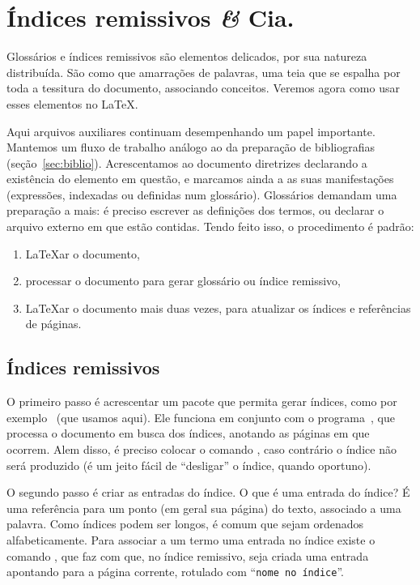 \section{Índices remissivos {\it \&} Cia.}\label{sec:indice-glossario}

Glossários e índices remissivos são elementos delicados, por sua
natureza distribuída. São como que amarrações de palavras, uma teia
que se espalha por toda a tessitura do documento, associando
conceitos. Veremos agora como usar esses elementos no \LaTeX.

Aqui arquivos auxiliares continuam desempenhando um papel
importante. Mantemos um fluxo de trabalho análogo ao da
preparação de bibliografias (seção~\ref{sec:biblio}). Acrescentamos ao
documento diretrizes declarando a existência do elemento em questão, e
marcamos ainda a as suas manifestações (expressões, indexadas ou
definidas num glossário). Glossários demandam uma preparação a mais: é
preciso escrever as definições dos termos, ou declarar o arquivo
externo em que estão contidas. Tendo feito isso, o procedimento é
padrão:
\begin{enumerate}
\item \LaTeX ar o documento,
\item processar o documento para gerar glossário ou índice remissivo,
\item \LaTeX ar o documento mais duas vezes, para atualizar os índices
  e referências de páginas.
\end{enumerate}

\subsection{Índices remissivos}

O primeiro passo é acrescentar um pacote que permita gerar índices,
como por exemplo~ (que usamos aqui). Ele funciona em
conjunto com o programa~, que processa o documento
em busca dos índices, anotando as páginas em que ocorrem. Alem disso,
é preciso colocar o comando , caso contrário o
índice não será produzido (é um jeito fácil de ``desligar'' o índice,
quando oportuno).

O segundo passo é criar as entradas do índice. O que é uma entrada do
índice? É uma referência para um ponto (em geral sua página) do texto,
associado a uma palavra. Como índices podem ser longos, é comum que
sejam ordenados alfabeticamente.
Para associar a um termo uma entrada no índice existe o comando
, que faz com que, no índice
remissivo, seja criada uma entrada apontando para a página corrente,
rotulado com ``{\tt nome no índice}''. 

